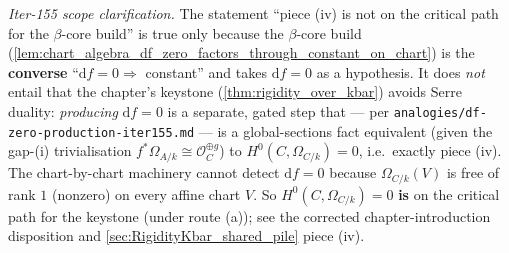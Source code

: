\emph{Iter-155 scope clarification.} The statement ``piece (iv) is not on the critical path for the \(\beta\)-core build'' is true only because the \(\beta\)-core build (\cref{lem:chart_algebra_df_zero_factors_through_constant_on_chart}) is the \textbf{converse} ``\(\mathrm df = 0 \Rightarrow\) constant'' and takes \(\mathrm df = 0\) as a hypothesis. It does \emph{not} entail that the chapter's keystone (\cref{thm:rigidity_over_kbar}) avoids Serre duality: \emph{producing} \(\mathrm df = 0\) is a separate, gated step that --- per \texttt{analogies/df-zero-production-iter155.md} --- is a global-sections fact equivalent (given the gap-(i) trivialisation \(f^{*}\Omega_{A/k} \cong \mathcal O_C^{\oplus g}\)) to \(H^0(C, \Omega_{C/k}) = 0\), i.e.\ exactly piece (iv). The chart-by-chart machinery cannot detect \(\mathrm df = 0\) because \(\Omega_{C/k}(V)\) is free of rank \(1\) (nonzero) on every affine chart \(V\). So \(H^0(C, \Omega_{C/k}) = 0\) \textbf{is} on the critical path for the keystone (under route (a)); see the corrected chapter-introduction disposition and \cref{sec:RigidityKbar_shared_pile} piece (iv).

